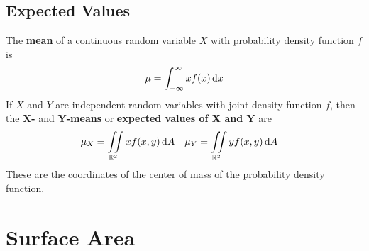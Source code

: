 \documentclass[../Calculus \Roman{3}.tex]{subfiles}
\begin{document}
		\subsection*{Expected Values}
			The \textbf{mean} of a continuous random variable $X$ with probability density function $f$ is
				\[\mu = \int_{-\infty}^\infty xf(x)\,\mathrm{d} x\]
			If $X$ and $Y$ are independent random variables with joint density function $f$, then the \textbf{$\bm{X}$-} and \textbf{$\bm{Y}$-means} or \textbf{expected values of $\bm{X}$ and $\bm{Y}$} are
				\begin{align*}
					\mu_X &= \iint\limits_{\mathbb{R}^2} xf(x, y)\,\mathrm{d} A &
							\mu_Y &= \iint\limits_{\mathbb{R}^2} yf(x, y)\,\mathrm{d} A
				\end{align*}
			These are the coordinates of the center of mass of the probability density function.
	\section{Surface Area}
		
\end{document}
